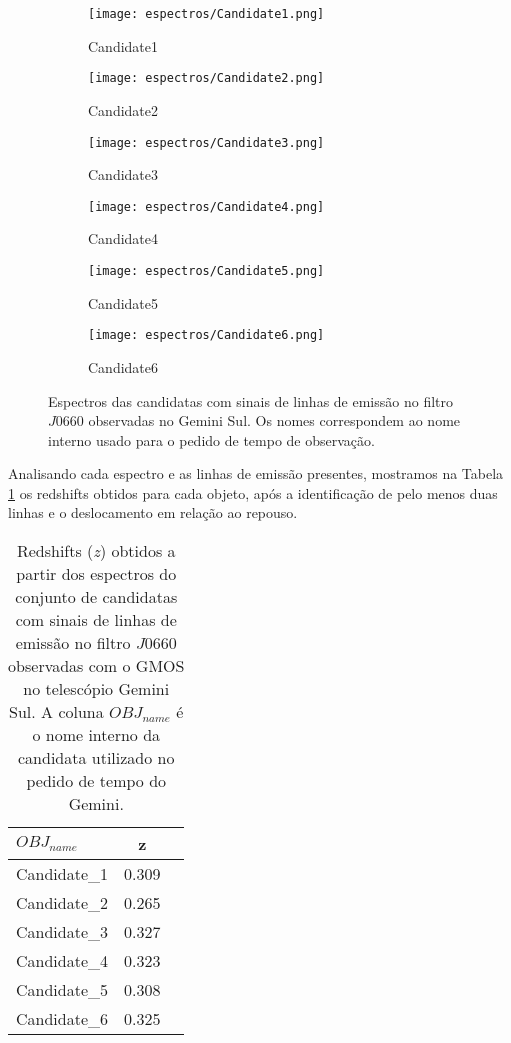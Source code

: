\begin{figure}[!ht]
    \centering
    \captionsetup{justification=centering}
    \begin{subfigure}[b]{0.45\textwidth}
        \texttt{[image: espectros/Candidate1.png]}
        \caption{Candidate1}
    \end{subfigure}
    \begin{subfigure}[b]{0.45\textwidth}
        \texttt{[image: espectros/Candidate2.png]}
        \caption{Candidate2}
    \end{subfigure}
    \begin{subfigure}[b]{0.45\textwidth}
        \texttt{[image: espectros/Candidate3.png]}
        \caption{Candidate3}
    \end{subfigure}
    \begin{subfigure}[b]{0.45\textwidth}
        \texttt{[image: espectros/Candidate4.png]}
        \caption{Candidate4}
    \end{subfigure}
    \begin{subfigure}[b]{0.45\textwidth}
        \texttt{[image: espectros/Candidate5.png]}
        \caption{Candidate5}
    \end{subfigure}
    \begin{subfigure}[b]{0.45\textwidth}
        \texttt{[image: espectros/Candidate6.png]}
        \caption{Candidate6}
    \end{subfigure}
    \caption{Espectros das candidatas com sinais de linhas de emissão no filtro $J0660$ observadas no Gemini Sul. Os nomes correspondem ao nome interno usado para o pedido de tempo de observação.}
    \label{espectros_candidatas_2}
\end{figure}

Analisando cada espectro e as linhas de emissão presentes, mostramos na Tabela \ref{redshift_candidatas_2} os redshifts obtidos para cada objeto, após a identificação de pelo menos duas linhas e o deslocamento em relação ao repouso.

\begin{table}[!ht]
    \centering
    \caption{Redshifts (\textit{z}) obtidos a partir dos espectros do conjunto de candidatas com sinais de linhas de emissão no filtro $J0660$ observadas com o GMOS no telescópio Gemini Sul. A coluna $OBJ_{name}$ é o nome interno da candidata utilizado no pedido de tempo do Gemini.} 
    \begin{tabular}{lcc}
        \toprule
        $OBJ_{name}$ & z   \\
        \midrule
        Candidate\_1     & 0.309 \\
        Candidate\_2     & 0.265 \\
        Candidate\_3     & 0.327 \\
        Candidate\_4     & 0.323 \\
        Candidate\_5     & 0.308 \\
        Candidate\_6     & 0.325 \\
        \bottomrule
    \end{tabular}
    \label{redshift_candidatas_2}
\end{table}

